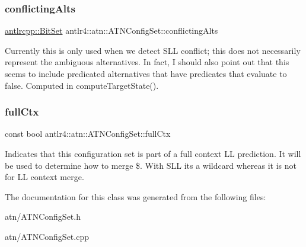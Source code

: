 \subsubsection{\texorpdfstring{conflicting\+Alts}{conflictingAlts}}
{\footnotesize\ttfamily \hyperlink{classantlrcpp_1_1BitSet}{antlrcpp\+::\+Bit\+Set} antlr4\+::atn\+::\+A\+T\+N\+Config\+Set\+::conflicting\+Alts}

Currently this is only used when we detect S\+LL conflict; this does not necessarily represent the ambiguous alternatives. In fact, I should also point out that this seems to include predicated alternatives that have predicates that evaluate to false. Computed in compute\+Target\+State(). \mbox{\label{classantlr4_1_1atn_1_1ATNConfigSet_af5ef274bd4b6185f2865add7f943633c}} 
\subsubsection{\texorpdfstring{full\+Ctx}{fullCtx}}
{\footnotesize\ttfamily const bool antlr4\+::atn\+::\+A\+T\+N\+Config\+Set\+::full\+Ctx}

Indicates that this configuration set is part of a full context LL prediction. It will be used to determine how to merge \$. With S\+LL it\textquotesingle{}s a wildcard whereas it is not for LL context merge. 

The documentation for this class was generated from the following files\+:\begin{DoxyCompactItemize}
\item 
atn/A\+T\+N\+Config\+Set.\+h\item 
atn/A\+T\+N\+Config\+Set.\+cpp\end{DoxyCompactItemize}
